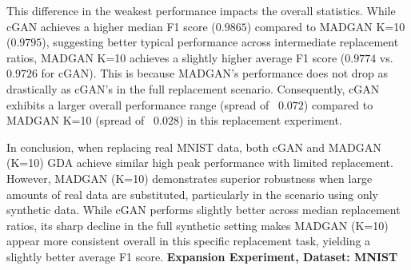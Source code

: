 This difference in the weakest performance impacts the overall statistics. While cGAN achieves a higher median F1 score ($0.9865$) compared to MADGAN K=10 ($0.9795$), suggesting better typical performance across intermediate replacement ratios, MADGAN K=10 achieves a slightly higher average F1 score ($0.9774$ vs. $0.9726$ for cGAN). This is because MADGAN's performance does not drop as drastically as cGAN's in the full replacement scenario. Consequently, cGAN exhibits a larger overall performance range (spread of ~$0.072$) compared to MADGAN K=10 (spread of ~$0.028$) in this replacement experiment.

In conclusion, when replacing real MNIST data, both cGAN and MADGAN (K=10) GDA achieve similar high peak performance with limited replacement. However, MADGAN (K=10) demonstrates superior robustness when large amounts of real data are substituted, particularly in the scenario using only synthetic data. While cGAN performs slightly better across median replacement ratios, its sharp decline in the full synthetic setting makes MADGAN (K=10) appear more consistent overall in this specific replacement task, yielding a slightly better average F1 score.
\newpage
\noindent\textbf{Expansion Experiment, Dataset: MNIST}
